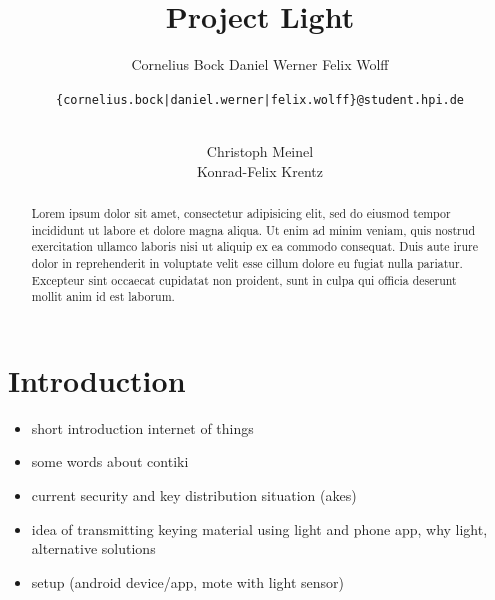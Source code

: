 \documentclass{sig-alternate} %
\begin{document}
\title{Project Light}


\author{
\alignauthor
Cornelius Bock
%
\alignauthor
Daniel Werner
%
\alignauthor
Felix Wolff
%
\and
\texttt{\{cornelius.bock|daniel.werner|felix.wolff\}@student.hpi.de} \\ \\
\and
\alignauthor
Christoph Meinel\\
%
\alignauthor
Konrad-Felix Krentz\\
}

\maketitle

\begin{abstract}
Lorem ipsum dolor sit amet, consectetur adipisicing elit, sed do eiusmod
tempor incididunt ut labore et dolore magna aliqua. Ut enim ad minim veniam,
quis nostrud exercitation ullamco laboris nisi ut aliquip ex ea commodo
consequat. Duis aute irure dolor in reprehenderit in voluptate velit esse
cillum dolore eu fugiat nulla pariatur. Excepteur sint occaecat cupidatat non
proident, sunt in culpa qui officia deserunt mollit anim id est laborum.
\end{abstract}




\section{Introduction}
\label{sec:introduction}

\begin{itemize}
	\item short introduction internet of things
	\item some words about contiki
	\item current security and key distribution situation (akes)
	\item idea of transmitting keying material using light and phone app, why light, alternative solutions
	\item setup (android device/app, mote with light sensor)
\end{itemize}
\end{document}
